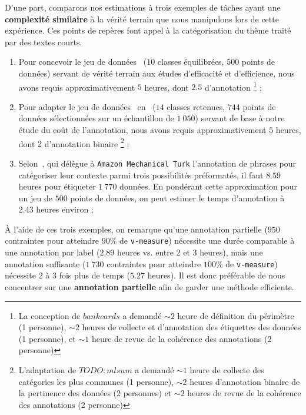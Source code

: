 			D'une part, comparons nos estimations à trois exemples de tâches ayant une \textbf{complexité similaire} à la vérité terrain que nous manipulons lors de cette expérience. Ces points de repères font appel à la catégorisation du thème traité par des textes courts.
			\begin{enumerate}
				\item Pour concevoir le jeu de données~ ($10$ classes équilibrées, $500$ points de données) servant de vérité terrain aux études d'efficacité et d'efficience, nous avons requis approximativement $5$ heures, dont $2.5$ d'annotation
				\footnote{La conception de $bank cards$ a demandé $\sim 2$ heure de définition du périmètre (1 personne), $\sim 2$ heures de collecte et d'annotation des étiquettes des données (1 personne), et $\sim 1$ heure de revue de la cohérence des annotations (2 personne)} ;
				\item Pour adapter le jeu de données~ en~ ($14$ classes retenues, $744$ points de données sélectionnées sur un échantillon de $1~050$) servant de base à notre étude du coût de l'annotation, nous avons requis approximativement $5$ heures, dont $2$ d'annotation binaire
				\footnote{L'adaptation de $TODO:mlsum$ a demandé $\sim 1$ heure de collecte des catégories les plus communes (1 personne), $\sim 2$ heures d'annotation binaire de la pertinence des données (2 personnes) et $\sim 2$ heures de revue de la cohérence des annotations (2 personne)} ;
				\item Selon~, qui délègue à \texttt{Amazon Mechanical Turk} l'annotation de phrases pour catégoriser leur contexte parmi trois possibilités préformatés, il faut $8.59$ heures pour étiqueter $1~770$ données. En pondérant cette approximation pour un jeu de $500$ points de données, on peut estimer le temps d'annotation à $2.43$ heures environ ;
			\end{enumerate}
			À l'aide de ces trois exemples, on remarque qu'une annotation partielle ($950$ contraintes pour atteindre $90$\% de \texttt{v-measure}) nécessite une durée comparable à une annotation par label ($2.89$ heures vs. entre $2$ et $3$ heures), mais une annotation suffisante ($1~730$ contraintes pour atteindre $100$\% de \texttt{v-measure}) nécessite 2 à 3 fois plus de temps ($5.27$ heures).
			Il est donc préférable de nous concentrer sur une \textbf{annotation partielle} afin de garder une méthode efficiente. 
			
